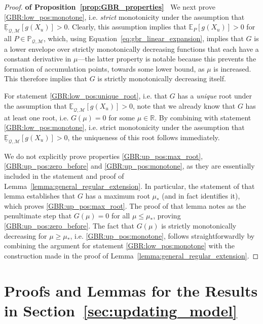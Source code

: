 \documentclass[twoside,11pt]{article}
\newcommand{\reals}{\mathbb{R}}
\newcommand{\lexp}{\underline{\mathbb{E}}_{\rateset,\mathcal{M}}}
\newcommand{\rateset}{\mathcal{Q}}
\begin{document}
\begin{proof}{\bf of Proposition~\ref{prop:GBR_properties}~}
We next prove \ref{GBR:low_pos:monotone}, i.e. \emph{strict} monotonicity under the assumption that $\lexp[g(X_u)]>0$. Clearly, this assumption implies that $\mathbb{E}_P[g(X_u)]>0$ for all $P\in\mathbb{P}_{\rateset,\mathcal{M}}$, which, using Equation~\ref{eq:gbr_linear_expansion}, implies that $G$ is a lower envelope over strictly monotonically decreasing functions that each have a constant derivative in $\mu$---the latter property is notable because this prevents the formation of accumulation points, towards some lower bound, as $\mu$ is increased. This therefore implies that $G$ is strictly monotonically decreasing itself.

For statement \ref{GBR:low_pos:unique_root}, i.e. that $G$ has a \emph{unique} root under the assumption that $\lexp[g(X_u)]>0$, note that we already know that $G$ has at least one root, i.e. $G(\mu)=0$ for some $\mu\in\reals$. By combining with statement \ref{GBR:low_pos:monotone}, i.e. strict monotonicity under the assumption that $\lexp[g(X_u)]>0$, the uniqueness of this root follows immediately.

We do not explicitly prove properties \ref{GBR:up_pos:max_root}, \ref{GBR:up_pos:zero_before} and \ref{GBR:up_pos:monotone}, as they are essentially included in the statement and proof of Lemma~\ref{lemma:general_regular_extension}. In particular, the statement of that lemma establishes that $G$ has a maximum root $\mu_*$ (and in fact identifies it), which proves \ref{GBR:up_pos:max_root}. The proof of that lemma notes as the penultimate step that $G(\mu)=0$ for all $\mu\leq \mu_*$, proving \ref{GBR:up_pos:zero_before}. The fact that $G(\mu)$ is strictly monotonically decreasing for $\mu\geq \mu_*$, i.e. \ref{GBR:up_pos:monotone}, follows straightforwardly by combining the argument for statement \ref{GBR:low_pos:monotone} with the construction made in the proof of Lemma~\ref{lemma:general_regular_extension}.
\end{proof}

\section{Proofs and Lemmas for the Results in Section~\ref{sec:updating_model}}
\end{document}
